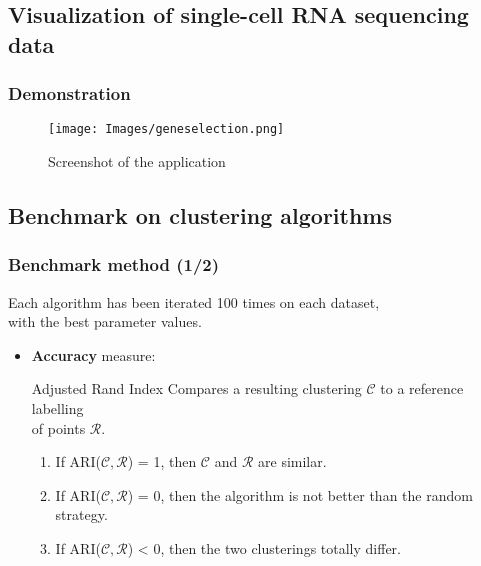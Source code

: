 \documentclass{beamer}
\begin{document}
\subsection{Visualization of single-cell RNA sequencing data}

\begin{frame}
\tableofcontents[currentsubsection]
\end{frame}

\begin{frame}
\frametitle{Demonstration}

\begin{figure}
\centering
\subfigure\texttt{[image: Images/geneselection.png]}
\caption{Screenshot of the application}
\end{figure}

\end{frame}

\subsection{Benchmark on clustering algorithms}

\begin{frame}
\tableofcontents[currentsubsection]
\end{frame}

\begin{frame}
\frametitle{Benchmark method (1/2)}

\begin{alertblock}{}
\begin{flushcenter}
Each algorithm has been iterated 100 times on each dataset,\\ with the best parameter values.
\end{flushcenter}
\end{alertblock}

\begin{itemize}
\item \textbf{Accuracy} measure:

\begin{block}{Adjusted Rand Index}
Compares a resulting clustering $\mathscr{C}$ to a reference labelling\\of points $\mathscr{R}$.
\begin{enumerate}
\item If ARI($\mathscr{C}, \mathscr{R}$) = 1, then $\mathscr{C}$ and $\mathscr{R}$ are similar.
\pause
\item If ARI($\mathscr{C}, \mathscr{R}$) = 0, then the algorithm is not better than the random strategy.
\pause
\item If ARI($\mathscr{C}, \mathscr{R}$) < 0, then the two clusterings totally differ.
\end{enumerate}
\end{block}

\end{itemize}

\end{frame}
\end{document}
